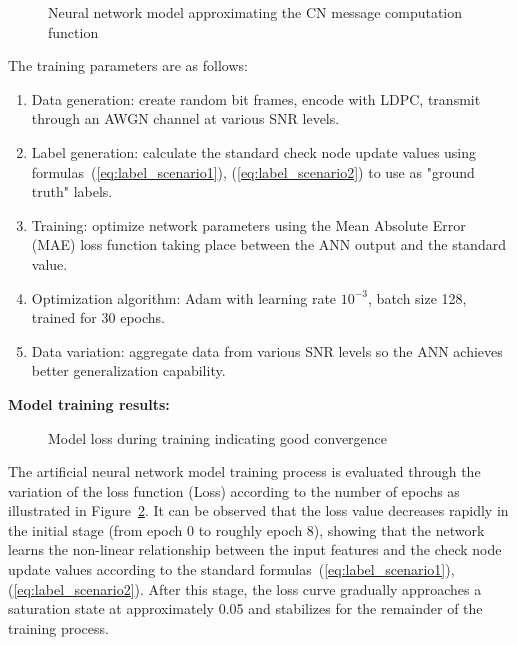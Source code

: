 \documentclass[a4paper,14pt]{extreport}
\begin{document}
\begin{figure}[H]
    \centering
    \caption{Neural network model approximating the CN message computation function}
    \label{fig:ann_model}
\end{figure}

The training parameters are as follows:
\begin{enumerate}
    \item Data generation: create random bit frames, encode with LDPC, transmit through an AWGN channel at various SNR levels.
    \item Label generation: calculate the standard check node update values using formulas~(\ref{eq:label_scenario1}), (\ref{eq:label_scenario2}) to use as "ground truth" labels.
    \item Training: optimize network parameters using the Mean Absolute Error (MAE) loss function taking place between the ANN output and the standard value.
    \item Optimization algorithm: Adam with learning rate $10^{-3}$, batch size 128, trained for 30 epochs.
    \item Data variation: aggregate data from various SNR levels so the ANN achieves better generalization capability.
\end{enumerate}

\textbf{Model training results:}

\begin{figure}[H]
    \centering
    \caption{Model loss during training indicating good convergence}
    \label{fig:model_loss}
\end{figure}

The artificial neural network model training process is evaluated through the variation of the loss function (Loss) according to the number of epochs as illustrated in Figure~\ref{fig:model_loss}. It can be observed that the loss value decreases rapidly in the initial stage (from epoch 0 to roughly epoch 8), showing that the network learns the non-linear relationship between the input features and the check node update values according to the standard formulas~(\ref{eq:label_scenario1}), (\ref{eq:label_scenario2}). After this stage, the loss curve gradually approaches a saturation state at approximately 0.05 and stabilizes for the remainder of the training process.
\end{document}
